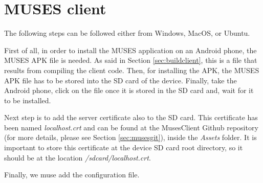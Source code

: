 \documentclass[a4paper,11pt]{book}
\begin{document}
\section{MUSES client}
\label{sec:musesclient}

The following steps can be followed either from Windows, MacOS, or Ubuntu.

First of all, in order to install the MUSES application on an Android phone, the MUSES APK file is needed. As said in Section \ref{sec:buildclient}, this is a file that results from compiling the client code. Then, for installing the APK, the MUSES APK file has to be stored into the SD card of the device. Finally, take the Android phone, click on the file once it is stored in the SD card and, wait for it to be installed.

Next step is to add the server certificate also to the SD card. This certificate has been named \textit{localhost.crt} and can be found at the MusesClient Github repository (for more details, please see Section \ref{sec:musesgit}), inside the \textit{Assets} folder. It is important to store this certificate at the device SD card root directory, so it should be at the location \textit{/sdcard/localhost.crt}.

Finally, we muse add the configuration file.



\end{document}
